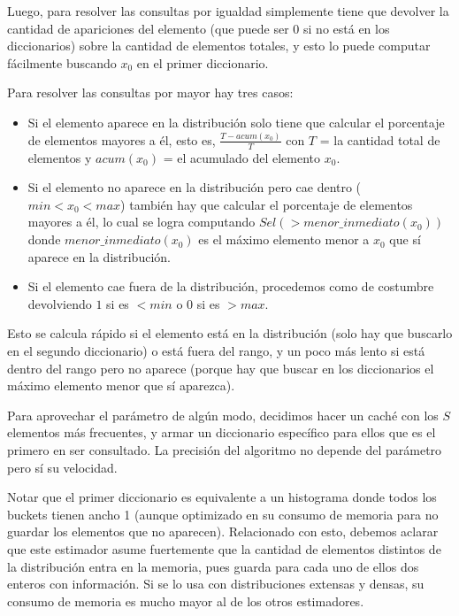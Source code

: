 Luego, para resolver las consultas por igualdad simplemente tiene que devolver la cantidad de apariciones del elemento (que puede ser 0 si no está en los diccionarios) sobre la cantidad de elementos totales, y esto lo puede computar fácilmente buscando $x_0$ en el primer diccionario.

Para resolver las consultas por mayor hay tres casos:
\begin{itemize}
 \item Si el elemento aparece en la distribución solo tiene que calcular el porcentaje de elementos mayores a él, esto es, $\frac{T-acum(x_0)}{T}$ con $T$ = la cantidad total de elementos y $acum(x_0)$ = el acumulado del elemento $x_0$.
 \item Si el elemento no aparece en la distribución pero cae dentro ($min < x_0 < max$) también hay que calcular el porcentaje de elementos mayores a él, lo cual se logra computando $Sel(>menor\_inmediato(x_0))$ donde $menor\_inmediato(x_0)$ es el máximo elemento menor a $x_0$ que sí aparece en la distribución.
 \item Si el elemento cae fuera de la distribución, procedemos como de costumbre devolviendo $1$ si es $<min$ o $0$ si es $>max$.
\end{itemize}
Esto se calcula rápido si el elemento está en la distribución (solo hay que buscarlo en el segundo diccionario) o está fuera del rango, y un poco más lento si está dentro del rango pero no aparece (porque hay que buscar en los diccionarios el máximo elemento menor que sí aparezca).

Para aprovechar el parámetro de algún modo, decidimos hacer un caché con los $S$ elementos más frecuentes, y armar un diccionario específico para ellos que es el primero en ser consultado. La precisión del algoritmo no depende del parámetro pero sí su velocidad.

Notar que el primer diccionario es equivalente a un histograma donde todos los buckets tienen ancho 1 (aunque optimizado en su consumo de memoria para no guardar los elementos que no aparecen). Relacionado con esto, debemos aclarar que este estimador asume fuertemente que la cantidad de elementos distintos de la distribución entra en la memoria, pues guarda para cada uno de ellos dos enteros con información. Si se lo usa con distribuciones extensas y densas, su consumo de memoria es mucho mayor al de los otros estimadores.